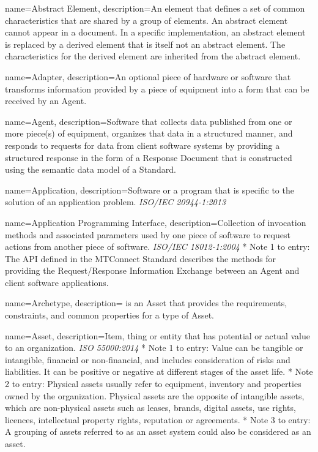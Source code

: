 
{
    name={Abstract Element},
	description={An element that defines a set of common characteristics that are shared by a group of elements.
An abstract element cannot appear in a document. In a specific implementation, an abstract element is replaced by a derived element that is itself not an abstract element. The characteristics for the derived element are inherited from the abstract element. 
}
}

{
    name={Adapter},
	description={An optional piece of hardware or software that transforms information provided by a piece of equipment into a form that can be received by an \gls{Agent}.}
}

{
    name={Agent},
	description={Software that collects data published from one or more piece(s) of equipment, organizes that data in a structured manner, and responds to requests for data from client software systems by providing a structured response in the form of a \gls{Response Document} that is constructed using the \gls{semantic data model} of a Standard. 
}
}

{
    name={Application},
	description={Software or a program that is specific to the solution of an application problem.
\textit{ISO/IEC 20944-1:2013}}
}

{
    name={Application Programming Interface},
	description={Collection of invocation methods and associated parameters used by one piece of software to request actions from another piece of software. \textit{ISO/IEC 18012-1:2004}
* Note 1 to entry: The API defined in the MTConnect Standard describes the methods for providing the \gls{Request/Response} Information Exchange between an \gls{Agent} and client software applications.}
}

{
    name={Archetype},
	description={ is an \gls{Asset} that provides the requirements, constraints, and common properties for a type of \gls{Asset}.}
}

{
    name={Asset},
	description={Item, thing or entity that has potential or actual value to an organization. \textit{ISO 55000:2014}
* Note 1 to entry: Value can be tangible or intangible, financial or non-financial, and includes consideration of risks and liabilities. It can be positive or negative at different stages of the asset life.
* Note 2 to entry: Physical assets usually refer to equipment, inventory and properties owned by the organization. Physical assets are the opposite of intangible assets, which are non-physical assets such as leases, brands, digital assets, use rights, licences, intellectual property rights, reputation or agreements.
* Note 3 to entry: A grouping of assets referred to as an asset system could also be considered as an asset.
}
}

